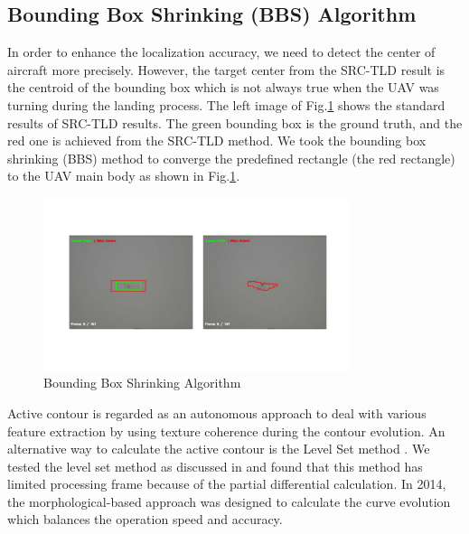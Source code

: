 \subsection{Bounding Box Shrinking (BBS) Algorithm}
In order to enhance the localization accuracy, we need to detect the center of aircraft more precisely. However, the target center from the SRC-TLD result is the centroid of the bounding box which is not always true when the UAV was turning during the landing process. The left image of Fig.\ref{fig:chp04_07_active_contour_demo} shows the standard results of SRC-TLD results. The green bounding box is the ground truth, and the red one is achieved from the SRC-TLD method. We took the bounding box shrinking (BBS) method to converge the predefined rectangle (the red rectangle) to the UAV main body as shown in Fig.\ref{fig:chp04_07_active_contour_demo}.

\begin{figure}[!th]
	\centering
	\includegraphics[width=0.8\textwidth]{Figs/chp04_07_active_contour_demo.pdf}
	\caption{Bounding Box Shrinking Algorithm}
	\label{fig:chp04_07_active_contour_demo}    
\end{figure}
Active contour is regarded as an autonomous approach to deal with various feature extraction by using texture coherence during the contour evolution. An alternative way to calculate the active contour is the Level Set method \cite{Caselles1993}. We tested the level set method as discussed in \cite{kong2013autonomous} and found that this method has limited processing frame because of the partial differential calculation. In 2014, the morphological-based approach was designed to calculate the curve evolution \cite{Marquez-Neila2014} which balances the operation speed and accuracy. 

